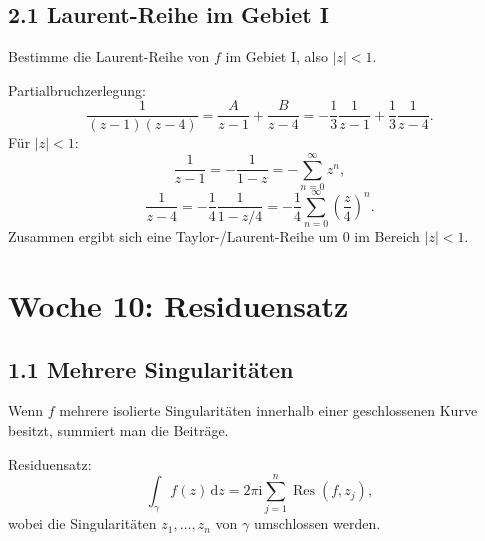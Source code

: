 \documentclass[11pt,a4paper]{article}
\newcommand{\ii}{\mathrm i}
\newcommand{\dd}{\,\mathrm d}
\newcommand{\Res}{\operatorname{Res}}
\begin{document}
\subsection{2.1 Laurent-Reihe im Gebiet I}
\begin{fragebox}
Bestimme die Laurent-Reihe von $f$ im Gebiet I, also $|z|<1$.
\end{fragebox}
\begin{antwortbox}
Partialbruchzerlegung:
\[
\frac1{(z-1)(z-4)}=\frac{A}{z-1}+\frac{B}{z-4}
=-\frac1{3}\frac1{z-1}+\frac1{3}\frac1{z-4}.
\]
Für $|z|<1$:
\[
\frac1{z-1}=-\frac1{1-z}=-\sum_{n=0}^{\infty}z^n,
\]
\[
\frac1{z-4}=-\frac14\frac1{1-z/4}=-\frac14\sum_{n=0}^{\infty}\left(\frac z4\right)^n.
\]
Zusammen ergibt sich eine Taylor-/Laurent-Reihe um $0$ im Bereich $|z|<1$.
\end{antwortbox}

\section{Woche 10: Residuensatz}

\subsection{1.1 Mehrere Singularitäten}
Wenn $f$ mehrere isolierte Singularitäten innerhalb einer geschlossenen Kurve besitzt, summiert man die Beiträge.

\begin{importantbox}
Residuensatz:
\[
\int_\gamma f(z)\dd z=2\pi\ii\sum_{j=1}^{n}\Res(f,z_j),
\]
wobei die Singularitäten $z_1,\ldots,z_n$ von $\gamma$ umschlossen werden.
\end{importantbox}

\begin{center}
\end{center}
\end{document}
